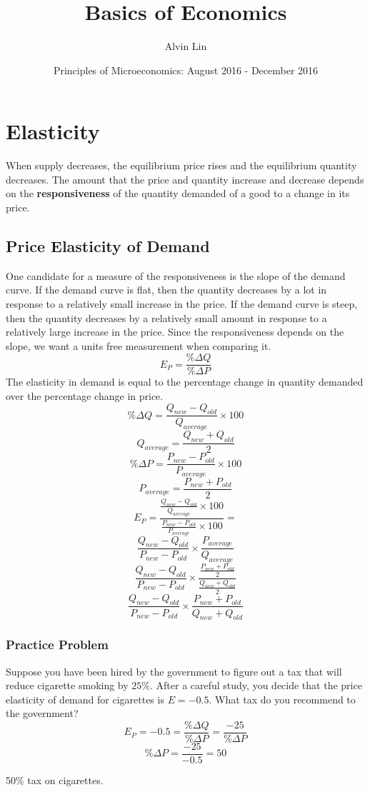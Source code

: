 \documentclass[letterpaper, 12pt]{article}
\title{Basics of Economics}
\author{Alvin Lin}
\date{Principles of Microeconomics: August 2016 - December 2016}
\begin{document}
\maketitle

\section{Elasticity}
When supply decreases, the equilibrium price rises and the equilibrium
quantity decreases. The amount that the price and quantity increase and
decrease depends on the \textbf{responsiveness} of the quantity demanded of
a good to a change in its price.

\subsection{Price Elasticity of Demand}
One candidate for a measure of the responsiveness is the slope of the demand
curve. If the demand curve is flat, then the quantity decreases by a lot in
response to a relatively small increase in the price. If the demand curve is
steep, then the quantity decreases by a relatively small amount in response to
a relatively large increase in the price. Since the responsiveness depends on
the slope, we want a units free measurement when comparing it.
\[ E_{P} = \frac{\%\Delta Q}{\%\Delta P} \]
The elasticity in demand is equal to the percentage change in quantity demanded
over the percentage change in price.
\[ \%\Delta Q = \frac{Q_{new}-Q_{old}}{Q_{average}}\times 100 \]
\[ Q_{average} = \frac{Q_{new}+Q_{old}}{2} \]
\[ \%\Delta P = \frac{P_{new}-P_{old}}{P_{average}}\times 100 \]
\[ P_{average} = \frac{P_{new}+P_{old}}{2} \]
\[ E_{P} = \frac{\frac{Q_{new}-Q_{old}}{Q_{average}}\times 100}
            {\frac{P_{new}-P_{old}}{P_{average}}\times 100} = \]
\[ \frac{Q_{new}-Q_{old}}{P_{new}-P_{old}}\times
   \frac{P_{average}}{Q_{average}} \]
\[ \frac{Q_{new}-Q_{old}}{P_{new}-P_{old}}\times
   \frac{\frac{P_{new}+P_{old}}{2}}{\frac{Q_{new}+Q_{old}}{2}} \]
\[ \frac{Q_{new}-Q_{old}}{P_{new}-P_{old}}\times
   \frac{P_{new}+P_{old}}{Q_{new}+Q_{old}} \]

\subsubsection{Practice Problem}
Suppose you have been hired by the government to figure out a tax that will
reduce cigarette smoking by \( 25\% \). After a careful study, you decide
that the price elasticity of demand for cigarettes is \( E = -0.5 \). What
tax do you recommend to the government?
\[ E_{P} = -0.5 = \frac{\%\Delta Q}{\%\Delta P} = \frac{-25}{\%\Delta P} \]
\[ \%\Delta P = \frac{-25}{-0.5} = 50 \]
\begin{center}
  50\% tax on cigarettes.
\end{center}
\end{document}
